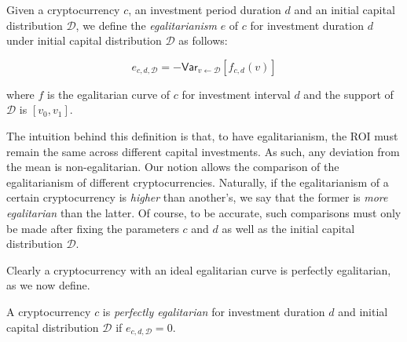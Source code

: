 \begin{definition}[Egalitarianism]
  Given a cryptocurrency $c$, an investment period duration $d$ and an initial
  capital distribution $\mathcal{D}$, we define the \emph{egalitarianism} $e$ of $c$
  for investment duration $d$ under initial capital distribution $\mathcal{D}$
  as follows:

  \[
    e_{c,d,\mathcal{D}} = -\textsf{Var}_{v \gets \mathcal{D}}[f_{c,d}(v)]
  \]

  where $f$ is the egalitarian curve of $c$ for investment interval $d$ and the support of
  $\mathcal{D}$ is $[v_0, v_1]$.
\end{definition}

The intuition behind this definition is that, to have egalitarianism, the ROI
must remain the same across different capital investments. As such, any
deviation from the mean is non-egalitarian. Our notion allows the comparison of
the egalitarianism of different cryptocurrencies. Naturally, if the
egalitarianism of a certain cryptocurrency is \emph{higher} than another's, we
say that the former is \emph{more egalitarian} than the latter. Of course, to be
accurate, such comparisons must only be made after fixing the parameters $c$
and $d$ as well as the initial capital distribution $\mathcal{D}$.

Clearly a cryptocurrency with an ideal egalitarian curve is perfectly
egalitarian, as we now define.

\begin{definition}
  A cryptocurrency $c$ is \emph{perfectly egalitarian} for investment duration
  $d$ and initial capital distribution $\mathcal{D}$ if
  $e_{c,d,\mathcal{D}} = 0$.
\end{definition}
